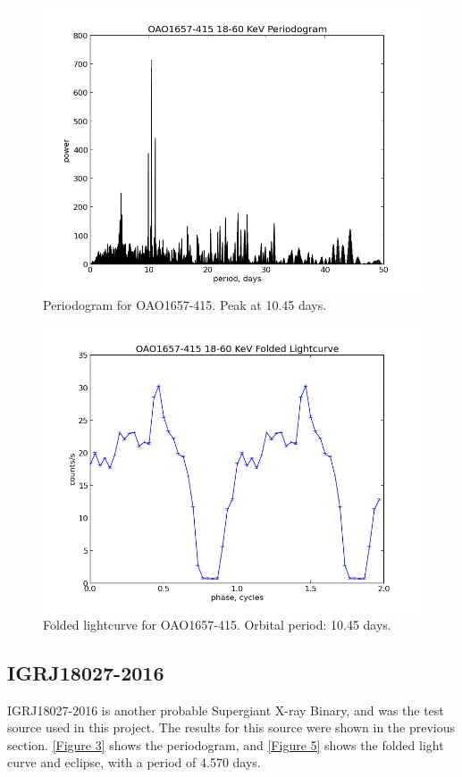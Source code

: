 \begin{figure}[h!]
\centering
\includegraphics[width=130mm]{gfx/Fig12.png}
\caption{Periodogram for OAO1657-415. Peak at 10.45 days.}
\label{Figure 12}
\end{figure} 

\begin{figure}[h!]
\centering
\includegraphics[width=130mm]{gfx/Fig13.png}
\caption{Folded lightcurve for OAO1657-415. Orbital period: 10.45 days.}
\label{Figure 13}
\end{figure} 

\subsection{IGRJ18027-2016}
IGRJ18027-2016 is another probable Supergiant X-ray Binary, and was the test source used in this project. The results for this source were shown in the previous section. \ref{Figure 3} shows the periodogram, and \ref{Figure 5} shows the folded light curve and eclipse, with a period of 4.570 days. 

